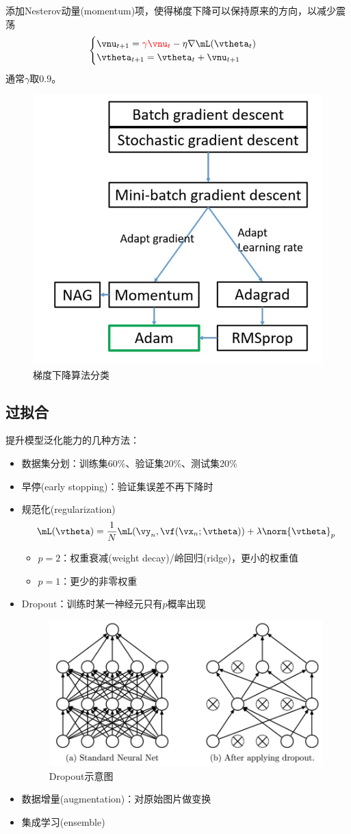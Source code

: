 添加Nesterov动量(momentum)项，使得梯度下降可以保持原来的方向，以减少震荡
\[\begin{cases}
    \vnu_{t+1}=\textcolor{red}{\gamma\vnu_t}-\eta\nabla\mL(\vtheta_t)\\
    \vtheta_{t+1}=\vtheta_t+\vnu_{t+1}
\end{cases}\]
通常$\gamma$取$0.9$。

\begin{figure}[H]
\centering
\includegraphics[width=0.5\linewidth]{fig/gd_catalog.jpg}
\caption{梯度下降算法分类}
\end{figure}

\subsection{过拟合}
提升模型泛化能力的几种方法：
\begin{itemize}
    \item 数据集分划：训练集60\%、验证集20\%、测试集20\%
    \item 早停(early stopping)：验证集误差不再下降时
    \item 规范化(regularization)
    \[\mL(\vtheta)=\frac{1}{N}\mL(\vy_n,\vf(\vx_n;\vtheta))+\lambda\norm{\vtheta}_p\]
    \begin{itemize}
        \item $p=2$：权重衰减(weight decay)/岭回归(ridge)，更小的权重值
        \item $p=1$：更少的非零权重
    \end{itemize}
    \item Dropout：训练时某一神经元只有$p$概率出现
    \begin{figure}[H]
        \centering
        \includegraphics[width=0.6\linewidth]{fig/dropout.jpg}
        \caption{Dropout示意图}
    \end{figure}
    \item 数据增量(augmentation)：对原始图片做变换
    \item 集成学习(ensemble)
\end{itemize}
